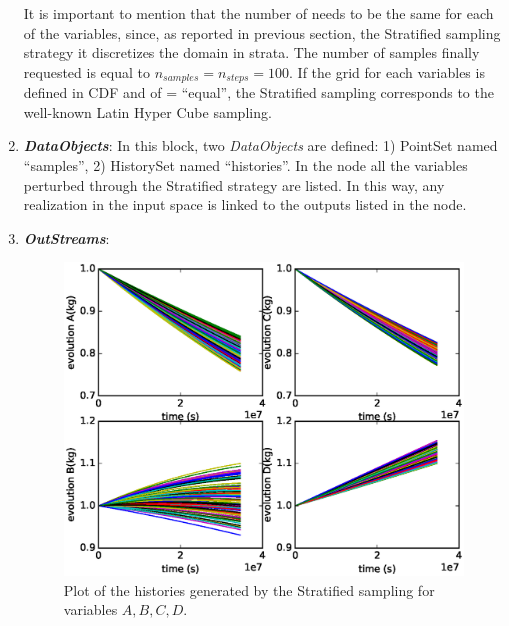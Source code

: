 \begin{enumerate}
  It is important to mention that the number of  needs to be the same for each of the variables,
  since, as reported in previous section, the Stratified sampling strategy it discretizes the domain in strata.
  The number of samples finally requested is equal to $n_{samples} = n_{steps} = 100$.
  If the grid for each variables is defined in CDF and of   = ``equal'', the Stratified
  sampling corresponds to the well-known Latin Hyper Cube sampling.
   \item \textbf{\textit{DataObjects}}:
  In this block, two \textit{DataObjects} are defined: 1) PointSet named
  ``samples'', 2) HistorySet named ``histories''.
  In the  node all the variables
  perturbed through the Stratified strategy are listed. In this way, any
  realization in the input space is linked to the outputs listed in  the
   node.
   \item \textbf{\textit{OutStreams}}:
 \begin{figure}[h!]
  \centering
  \includegraphics[scale=0.7]{../../tests/framework/user_guide/ForwardSamplingStrategies/gold/RunDir/Stratified/1-historyPlot_line-line-line-line.eps}
  \caption{Plot of the histories generated by the Stratified sampling for variables $A,B,C,D$.}
  \label{fig:historiesStratifiedPlotLine}

\end{figure}
\end{enumerate}
